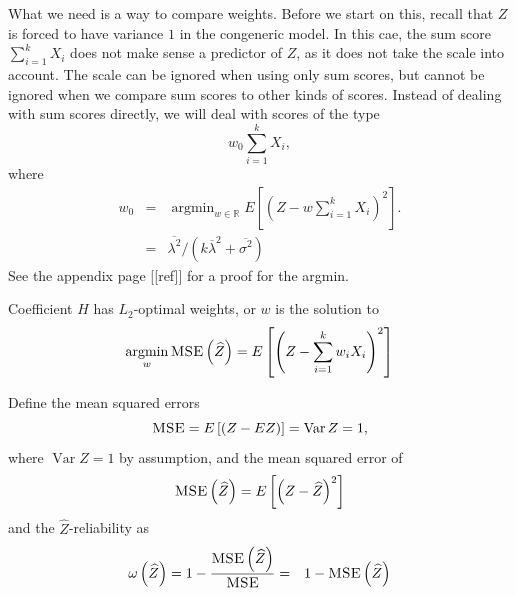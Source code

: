 \documentclass{article}
\theoremstyle{plain}
\theoremstyle{plain}
\theoremstyle{definition}
\theoremstyle{remark}
\theoremstyle{definition}
\theoremstyle{plain}
\theoremstyle{plain}
\theoremstyle{definition}
\DeclareMathOperator{\Var}{Var}
\DeclareMathOperator{\argmin}{argmin}
\begin{document}
What we need is a way to compare weights. Before we start on this,
recall that $Z$ is forced to have variance $1$ in the congeneric
model. In this cae, the sum score $\sum_{i=1}^{k}X_{i}$ does not
make sense a predictor of $Z$, as it does not take the scale into
account. The scale can be ignored when using only sum scores, but
cannot be ignored when we compare sum scores to other kinds of scores.
Instead of dealing with sum scores directly, we will deal with scores
of the type
\[
w_{0}\sum_{i=1}^{k}X_{i},
\]
where
\begin{eqnarray}
w_{0} & = & \argmin_{w\in\mathbb{R}}E\left[\left(Z-w\sum_{i=1}^{k}X_{i}\right)^{2}\right].\nonumber \\
 & = & \overline{\lambda^{2}}/\left(k\overline{\lambda}^{2}+\overline{\sigma^{2}}\right)\label{eq:w0}
\end{eqnarray}
See the appendix page {[}{[}ref{]}{]} for a proof for the argmin.

Coefficient $H$ has $L_2$-optimal weights, or $w$ is the solution
to
\[
\argmin_{w}\textsc{MSE}\left(\widehat{Z}\right)=E\left[\left(Z-\sum_{i=1}^{k}w_{i}X_{i}\right)^{2}\right]
\]

Define the mean squared errors
\[
\textsc{MSE}=E\left[\left(Z-EZ\right)\right]=\Var Z=1,
\]
where $\Var Z=1$ by assumption, and the mean squared error of
\[
\textsc{MSE}\left(\widehat{Z}\right)=E\left[\left(Z-\widehat{Z}\right)^{2}\right]
\]
and the $\widehat{Z}$-reliability as
\begin{eqnarray}
\omega\left(\widehat{Z}\right) & =1-\frac{\textsc{MSE}\left(\widehat{Z}\right)}{\textsc{MSE}}= & 1-\textsc{MSE}\left(\widehat{Z}\right)\label{eq:Z-reliability}
\end{eqnarray}
\end{document}
